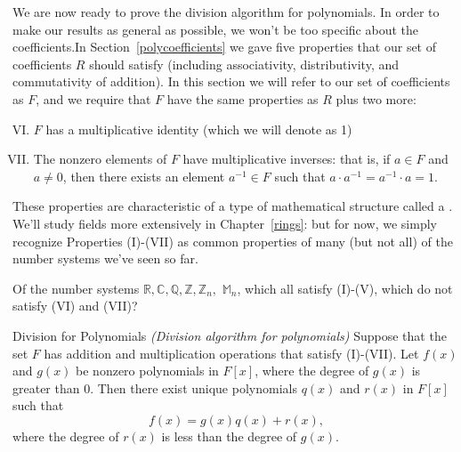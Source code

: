 We are now ready to prove the division algorithm for polynomials. In order to make our results as general as possible, we won't be too specific about the coefficients.In Section~\ref{polycoefficients} we gave five properties that our set of coefficients $R$ should satisfy (including associativity, distributivity, and commutativity of addition). In this section we will refer to our set of coefficients as $F$, and we require that $F$ have the same properties as $R$ plus two more:

\begin{enumerate}[(I)]
\setcounter{enumi}{5}
    \item
    $F$ has a multiplicative identity (which we will denote as 1)
    \item
    The nonzero elements of $F$ have multiplicative inverses: that is, if $a \in F$ and $a \neq 0$, then there exists an element $a^{-1} \in F$ such that $a \cdot a^{-1} = a^{-1} \cdot a = 1$.
\end{enumerate}

These properties are characteristic of a type of mathematical structure called a . We'll study fields more extensively in Chapter~\ref{rings}: but for now, we simply recognize Properties (I)-(VII) as common properties of many (but not all) of the number systems we've seen so far.

\begin{exercise}{}
Of the number systems ${\mathbb R},{\mathbb C},{\mathbb Q},{\mathbb Z},{\mathbb Z}_n,$  ${\mathbb M}_n$, which all satisfy (I)-(V), which do not satisfy (VI) and (VII)?
\end{exercise}

\begin{prop} {Division for Polynomials} \emph{(Division algorithm for polynomials)}
Suppose that the set $F$ has  addition and multiplication operations that satisfy (I)-(VII).  Let $f(x)$ and $g(x)$ be nonzero polynomials in $F[x]$, where the degree of $g(x)$ is greater than 0.  Then there exist unique polynomials $q(x)$ and $r(x)$ in $F[x]$ such that 
\[
f(x) = g(x)q(x) + r(x),
\]
where the degree of $r(x)$ is less than the degree of $g(x)$.
\end {prop}

